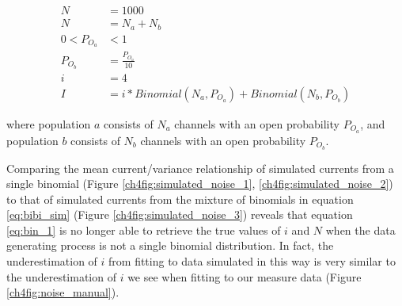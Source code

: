 \begin{equation}\label{eq:bibi_sim}
\begin{split}
	N &= 1000 \\
	N &= N_a + N_b \\
	0 < P_{O_{a}} &< 1 \\
	P_{O_{b}} &= \frac{P_{O_{a}}}{10} \\
	i &= 4 \\
	I &= i * Binomial(N_a, P_{O_{a}}) + Binomial(N_b, P_{O_{b}})
\end{split}
\end{equation}

where population $a$ consists of $N_a$ channels with an open probability $P_{O_{a}}$, and population $b$ consists of $N_b$ channels with an open probability $P_{O_{b}}$.

Comparing the mean current/variance relationship of simulated currents from a single binomial (Figure \ref{ch4fig:simulated_noise_1}, \ref{ch4fig:simulated_noise_2}) to that of simulated currents from the mixture of binomials in equation \ref{eq:bibi_sim} (Figure \ref{ch4fig:simulated_noise_3}) reveals that equation \ref{eq:bin_1} is no longer able to retrieve the true values of $i$ and $N$ when the data generating process is not a single binomial distribution.
In fact, the underestimation of $i$ from fitting to data simulated in this way is very similar to the underestimation of $i$ we see when fitting to our measure data (Figure \ref{ch4fig:noise_manual}).


